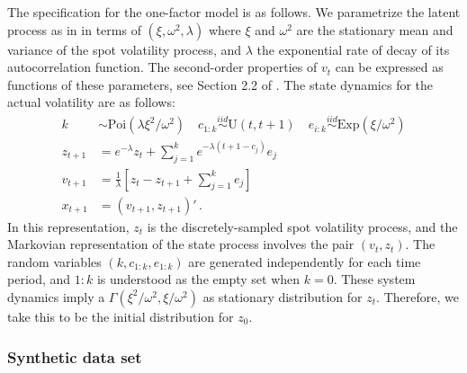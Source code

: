 \documentclass{statsoc}
\newcommand{\iid}{\stackrel{iid}{\sim}}
\begin{document}
The specification for the
one-factor model is as follows. We parametrize the latent process as in
\cite{bns:real} in terms of $(\xi,\omega^2,\lambda)$ where $\xi$ and $\omega^2$ are
the stationary mean and variance of the spot volatility process, and
$\lambda$ the exponential rate of decay of its 
autocorrelation function.  The second-order properties of $v_t$ can be
expressed as functions of these parameters,
see Section 2.2 of \cite{bns:real}. The
state dynamics for the actual volatility are as follows: 
\begin{equation}
  \label{eq:ssf}
  \begin{split}
     k  & \sim  \mathrm{Poi}\left( \lambda \xi^2/\omega^2 \right) \quad 
 c_{1:k}  \iid  \mathrm{U}(t,t+1) \quad 
e_{i:k}  \iid  \mathrm{Exp}\left(\xi/\omega^2 \right)  \\ 
  z_{t+1}  & =  e^{-\lambda} z_t + \sum_{j=1}^k  e^{-\lambda(t+1-c_j)}
  e_j \\
v_{t+1} & =  {\frac{1}{\lambda}} \left [ z_t - z_{t+1} + \sum_{j=1}^k e_j
\right ] \\
x_{t+1} & =  (v_{t+1},z_{t+1})' \, .
  \end{split}
\end{equation}
In this representation, $z_t$ is the discretely-sampled spot
volatility process, and the Markovian representation of the state
process involves the pair $(v_t,z_t)$. The random variables $(k,c_{1:k},e_{1:k})$ are generated
independently for each time period, and $1:k$ is understood as the
empty set when  $k=0$. These system dynamics imply a
$\Gamma(\xi^2/\omega^2,\xi/\omega^2)$ as stationary distribution for $z_t$. 
Therefore, we take this to be the initial distribution for $z_0$.



\subsubsection{Synthetic data set}
\end{document}

